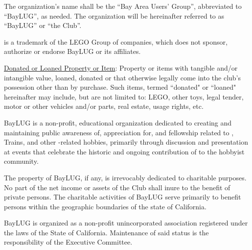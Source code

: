 \documentclass{bylaws}
\date{October 28, 2012}
\begin{document}

\maketitle %


\label{art:name}
The organization's name shall be the ``Bay Area \LEGO Users' Group'', abbreviated to ``BayLUG'', as needed.  The organization will be hereinafter referred to as ``BayLUG'' or ``the Club''.

\LEGO is a trademark of the LEGO Group of companies, which does not sponsor, authorize or endorse BayLUG or its affiliates.

\underline{Donated or Loaned Property or Item}: Property or items with tangible and/or intangible value, loaned, donated or that otherwise legally come into the club's possession other than by purchase. Such items, termed ``donated" or ``loaned" hereinafter may include, but are not limited to: LEGO, other toys, legal tender, motor or other vehicles and/or parts, real estate, usage rights, etc.




BayLUG is a non-profit, educational organization dedicated to creating and maintaining public awareness of, appreciation for, and fellowship related to \LEGO, \LEGO Trains, and other \LEGO-related hobbies, primarily through discussion and presentation at events that celebrate the historic and ongoing contribution of \LEGO to the hobbyist community. 


The property of BayLUG, if any, is irrevocably dedicated to charitable purposes. No part of the net income or assets of the Club shall inure to the benefit of private persons.  The charitable activities of BayLUG serve primarily to benefit persons within the geographic boundaries of the state of California.


BayLUG is organized as a non-profit unincorporated association registered under the laws of the State of California. Maintenance of said status is the responsibility of the Executive Committee.
\end{document}
